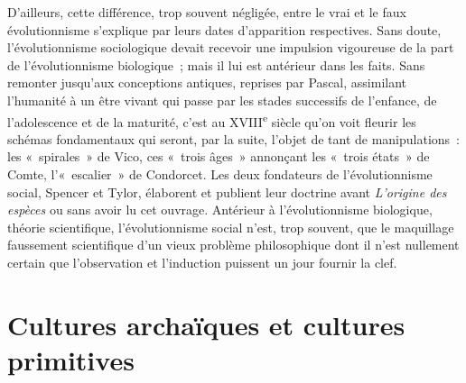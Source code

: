 \documentclass[french,twoside]{book} %
\begin{document}
D’ailleurs, cette différence, trop souvent négligée, entre le vrai et le faux évolutionnisme s’explique par leurs dates d’apparition respectives. Sans doute, l’évolutionnisme sociologique devait recevoir une impulsion vigoureuse de la part de l’évolutionnisme biologique ; mais il lui est antérieur dans les faits. Sans remonter jusqu’aux conceptions antiques, reprises par Pascal, assimilant l’humanité à un être vivant qui passe par les stades successifs de l’enfance, de l’adolescence et de la maturité, c’est au XVIII\textsuperscript{e} siècle qu’on voit fleurir les schémas fondamentaux qui seront, par la suite, l’objet de tant de manipulations : les « spirales » de Vico, ces « trois âges » annonçant les « trois états » de Comte, l’« escalier » de Condorcet. Les deux fondateurs de l’évolutionnisme social, Spencer et Tylor, élaborent et publient leur doctrine avant \emph{L’origine des espèces} ou sans avoir lu cet ouvrage. Antérieur à l’évolutionnisme biologique, théorie scientifique, l’évolutionnisme social n’est, trop souvent, que le maquillage faussement scientifique d’un vieux problème philosophique dont il n’est nullement certain que l’observation et l’induction puissent un jour fournir la clef.

\section[{Cultures archaïques et cultures primitives}]{Cultures archaïques et cultures primitives}
\renewcommand{\leftmark}{Cultures archaïques et cultures primitives}
\end{document}
